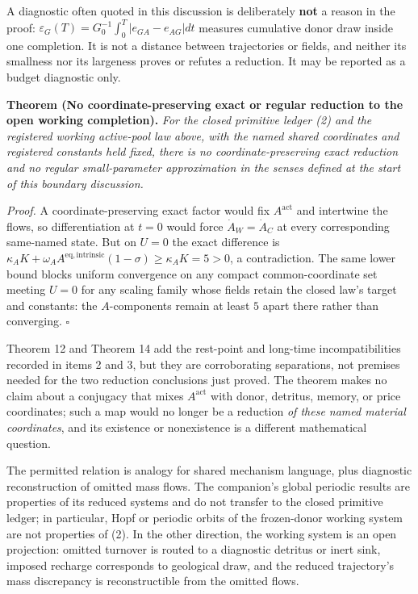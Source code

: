 \documentclass[11pt]{article}
\begin{document}
A diagnostic often quoted in this discussion is deliberately \textbf{not} a reason in the proof: \(\varepsilon_G(T)=G_0^{-1}\int_0^T|e_{GA}-e_{AG}|dt\) measures cumulative donor draw inside one completion. It is not a distance between trajectories or fields, and neither its smallness nor its largeness proves or refutes a reduction. It may be reported as a budget diagnostic only.

\textbf{Theorem (No coordinate-preserving exact or regular reduction to the open working completion).} \emph{For the closed primitive ledger (2) and the registered working active-pool law above, with the named shared coordinates and registered constants held fixed, there is no coordinate-preserving exact reduction and no regular small-parameter approximation in the senses defined at the start of this boundary discussion.}

\emph{Proof.} A coordinate-preserving exact factor would fix \(A^{\mathrm{act}}\) and intertwine the flows, so differentiation at \(t=0\) would force \(\dot A_W=\dot A_C\) at every corresponding same-named state. But on \(U=0\) the exact difference is \(\kappa_AK+\omega_AA^{\mathrm{eq,intrinsic}}(1-\sigma)\ge\kappa_AK=5>0\), a contradiction. The same lower bound blocks uniform convergence on any compact common-coordinate set meeting \(U=0\) for any scaling family whose fields retain the closed law's target and constants: the \(A\)-components remain at least \(5\) apart there rather than converging. \(\square\)

Theorem 12 and Theorem 14 add the rest-point and long-time incompatibilities recorded in items 2 and 3, but they are corroborating separations, not premises needed for the two reduction conclusions just proved. The theorem makes no claim about a conjugacy that mixes \(A^{\mathrm{act}}\) with donor, detritus, memory, or price coordinates; such a map would no longer be a reduction \emph{of these named material coordinates}, and its existence or nonexistence is a different mathematical question.

The permitted relation is analogy for shared mechanism language, plus diagnostic reconstruction of omitted mass flows. The companion's global periodic results are properties of its reduced systems and do not transfer to the closed primitive ledger; in particular, Hopf or periodic orbits of the frozen-donor working system are not properties of (2). In the other direction, the working system is an open projection: omitted turnover is routed to a diagnostic detritus or inert sink, imposed recharge corresponds to geological draw, and the reduced trajectory's mass discrepancy is reconstructible from the omitted flows.
\end{document}

